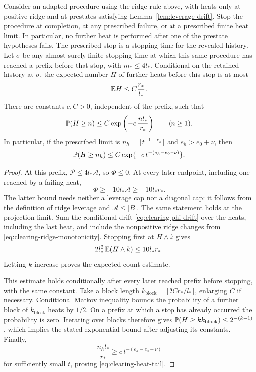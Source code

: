 \begin{lemma}\label{lem:clearing-heat-count}
Consider an adapted procedure using the ridge rule above, with heats only at
positive ridge and at prestates satisfying Lemma~\ref{lem:leverage-drift}.
Stop the procedure at completion, at any prescribed failure, or at
a prescribed finite heat limit.  In particular, no further heat
is performed after one of the prestate hypotheses fails. The prescribed
stop is a stopping time for the revealed history. Let \(\sigma\) be any
almost surely finite stopping time at which this same procedure has reached
a prefix before that stop, with \(m_*\le4l_*\). Conditional on the retained
history at \(\sigma\), the expected number
\(H\) of further heats before this stop is at most
\[
 \mathbb E H\le C\frac{r_*}{l_*}.
\]
There are constants \(c,C>0\), independent of the prefix, such that
\[
 \mathbb P(H\ge n)\le C\exp\left(-c\,\frac{nl_*}{r_*}\right)
 \qquad(n\ge1).
\]
In particular, if the prescribed limit is
\(n_h=\lfloor t^{-1-e_h}\rfloor\) and \(e_h>e_0+\nu\), then
\begin{equation}\label{eq:clearing-heat-tail}
 \mathbb P(H\ge n_h)
 \le C\exp\{-c\,t^{-(e_h-e_0-\nu)}\}.
\end{equation}
\end{lemma}

\begin{proof}
At this prefix, \(\mathcal P\le4l_*\mathcal A\), so \(\Phi\le0\).
At every later endpoint, including one reached by a failing heat,
\[
 \Phi\ge-10l_*\mathcal A\ge-10l_*r_*.
\]
The latter bound needs neither a leverage cap nor a diagonal cap:
it follows from the definition of ridge leverage and
\(\mathcal A\le|B|\).  The same statement holds at the projection
limit.  Sum the conditional drift \eqref{eq:clearing-phi-drift}
over the heats, including the last heat, and include the nonpositive
ridge changes from \eqref{eq:clearing-ridge-monotonicity}.
Stopping first at \(H\wedge k\) gives
\[
 2l_*^2\,\mathbb E(H\wedge k)\le10l_*r_*.
\]
Letting \(k\) increase proves the expected-count estimate.

This estimate holds conditionally after every later reached prefix before stopping, with
the same constant.  Take a block length
\(k_{\mathrm{block}}=\lceil 2Cr_*/l_*\rceil\), enlarging \(C\) if necessary.
Conditional Markov inequality bounds the probability of a further
block of \(k_{\mathrm{block}}\) heats by \(1/2\).  On a prefix at which a stop has
already occurred the probability is zero.  Iterating over blocks
therefore gives
\(\mathbb P(H\ge k k_{\mathrm{block}})\le2^{-(k-1)}\), which implies the stated exponential
bound after adjusting its constants.  Finally,
\[
 \frac{n_hl_*}{r_*}
 \ge c\,t^{-(e_h-e_0-\nu)}
\]
for sufficiently small \(t\), proving \eqref{eq:clearing-heat-tail}.
\end{proof}

